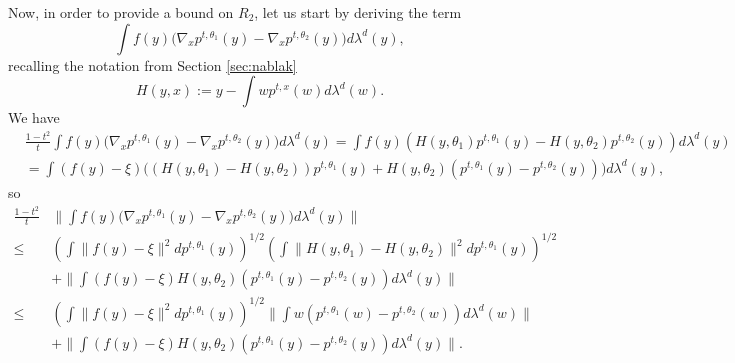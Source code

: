 \documentclass{article}
\begin{document}
Now, in order to provide a bound on $R_2$, let us start by deriving the term 
$$\int f(y)\big(\nabla_x p^{t,\theta_1}(y)-\nabla_x p^{t,\theta_2}(y)\big)d\lambda^d(y),$$
recalling the notation from Section \ref{sec:nablak}
$$H(y,x):=y-\int wp^{t,x}(w)d\lambda^d(w).$$
We have
\begin{align*}
 &\frac{1-t^2}{t}\int f(y)\big(\nabla_x p^{t,\theta_1}(y)-\nabla_x p^{t,\theta_2}(y)\big)d\lambda^d(y)=\int f(y)\left(H(y,\theta_1)p^{t,\theta_1}(y)- H(y,\theta_2)p^{t,\theta_2}(y)\right)d\lambda^d(y)\\
 & =\int (f(y)-\xi)\Big((H(y,\theta_1)-H(y,\theta_2))p^{t,\theta_1}(y)+ H(y,\theta_2)(p^{t,\theta_1}(y)-p^{t,\theta_2}(y))\Big)d\lambda^d(y),
\end{align*}
so 
\begin{align}\label{align:boundR2}
    \frac{1-t^2}{t}&\|\int f(y)\big(\nabla_x p^{t,\theta_1}(y)-\nabla_x p^{t,\theta_2}(y)\big)d\lambda^d(y)\|\nonumber\\
    \leq & \left(\int \|f(y)-\xi\|^2dp^{t,\theta_1}(y)\right)^{1/2}\left(\int \|H(y,\theta_1)-H(y,\theta_2)\|^{2}dp^{t,\theta_1}(y)\right)^{1/2}\nonumber\\
    & + \|\int (f(y)-\xi)H(y,\theta_2)(p^{t,\theta_1}(y)-p^{t,\theta_2}(y))d\lambda^d(y)\|\nonumber\\
    \leq & \left(\int \|f(y)-\xi\|^2dp^{t,\theta_1}(y)\right)^{1/2}\|\int w (p^{t,\theta_1}(w)-p^{t,\theta_2}(w))d\lambda^d(w)\|\nonumber\\
    & + \|\int (f(y)-\xi)H(y,\theta_2)(p^{t,\theta_1}(y)-p^{t,\theta_2}(y))d\lambda^d(y)\|.
\end{align}
\end{document}
